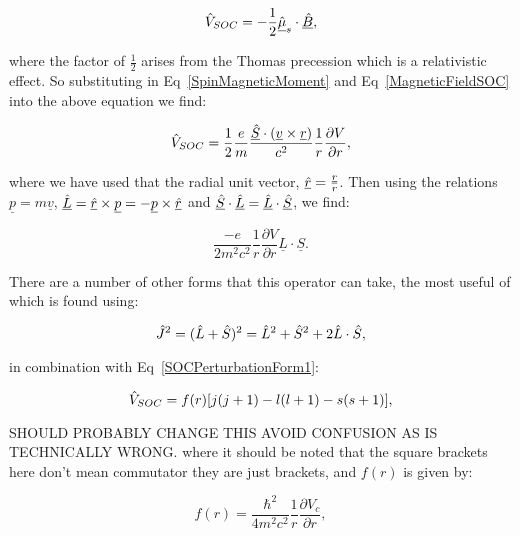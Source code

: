 \begin{equation}
    \Hat{V}_{SOC} = - \frac{1}{2} \underline{\Hat{\mu}}_s \cdot \underline{\Hat{B}},
    \label{SOCPerturbation}
\end{equation}

\noindent where the factor of $\frac{1}{2}$ arises from the Thomas precession which is a relativistic effect. So substituting in Eq~\ref{SpinMagneticMoment} and Eq~\ref{MagneticFieldSOC} into the above equation we find:

\begin{equation}
    \Hat{V}_{SOC} = \frac{1}{2} \frac{e}{m} \frac{\underline{\Hat{S}} \cdot (\underline{v} \times \underline{r})}{c^2} \frac{1}{r} \frac{\partial V}{\partial r},
\end{equation}

\noindent where we have used that the radial unit vector, $\underline{\Hat{r}} = \frac{\underline{r}}{r}$. Then using the relations $\underline{p} = m \underline{v}$, $\underline{\Hat{L}} = \underline{\Hat{r}} \times \underline{p} = - \underline{p} \times \underline{\Hat{r}}$ and $\underline{\Hat{S}} \cdot \underline{\Hat{L}} = \underline{\Hat{L}} \cdot \underline{\Hat{S}}$, we find:

\begin{equation}
    \frac{-e}{2m^2c^2} \frac{1}{r} \frac{\partial V}{\partial r} \underline{L} \cdot \underline{S}.
    \label{SOCPerturbationForm1}
\end{equation}

\noindent There are a number of other forms that this operator can take, the most useful of which is found using:

\begin{equation}
    \Hat{J}^2 = (\Hat{L} + \Hat{S})^2 = \Hat{L}^2 + \Hat{S}^2 + 2 \Hat{L} \cdot \Hat{S},
    \label{TotalAngularMomentumExpansion}
\end{equation}

\noindent in combination with Eq~\ref{SOCPerturbationForm1}:

\begin{equation}
    \Hat{V}_{SOC} = f(r)[j(j + 1) - l(l + 1) - s(s + 1)],
    \label{SOCPerturbationForm2}
\end{equation}

\noindent SHOULD PROBABLY CHANGE THIS AVOID CONFUSION AS IS TECHNICALLY WRONG. where it should be noted that the square brackets here don't mean commutator they are just brackets, and $f(r)$ is given by:

\begin{equation}
    f(r) = \frac{\hbar^2}{4m^2c^2} \frac{1}{r} \frac{\partial V_c}{\partial r},
    \label{f(r)Form}
\end{equation}

